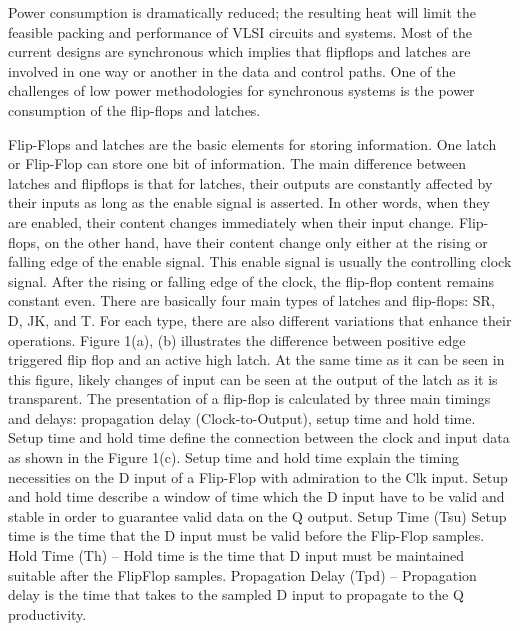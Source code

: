 \documentclass{article}
\begin{document}
	
	Power consumption is dramatically reduced; the
	resulting heat will limit the feasible packing and
	performance of VLSI circuits and systems. Most of the
	current designs are synchronous which implies that flipflops
	and latches are involved in one way or another in the
	data and control paths. One of the challenges of low power
	methodologies for synchronous systems is the power
	consumption of the flip-flops and latches. 
	
	Flip-Flops and latches are the basic elements for storing
	information. One latch or Flip-Flop can store one bit of
	information. The main difference between latches and flipflops
	is that for latches, their outputs are constantly affected
	by their inputs as long as the enable signal is asserted. In
	other words, when they are enabled, their content changes
	immediately when their input change. Flip-flops, on the
	other hand, have their content change only either at the
	rising or falling edge of the enable signal. This enable signal
	is usually the controlling clock signal. After the rising or
	falling edge of the clock, the flip-flop content remains
	constant even. There are basically four main types of latches
	and flip-flops: SR, D, JK, and T. For each type, there are
	also different variations that enhance their operations. Figure
	1(a), (b) illustrates the difference between positive edge
	triggered flip flop and an active high latch. At the same time
	as it can be seen in this figure, likely changes of input can be
	seen at the output of the latch as it is transparent. 
	The presentation of a flip-flop is calculated by three main
	timings and delays: propagation delay (Clock-to-Output),
	setup time and hold time. Setup time and hold time define
	the connection between the clock and input data as shown in
	the Figure 1(c). Setup time and hold time explain the timing
	necessities on the D input of a Flip-Flop with admiration to
	the Clk input. Setup and hold time describe a window of
	time which the D input have to be valid and stable in order
	to guarantee valid data on the Q output. Setup Time (Tsu)
	Setup time is the time that the D input must be valid before
	the Flip-Flop samples. Hold Time (Th) – Hold time is the
	time that D input must be maintained suitable after the FlipFlop
	samples. Propagation Delay (Tpd) – Propagation delay
	is the time that takes to the sampled D input to propagate to
	the Q productivity. 
\end{document}
